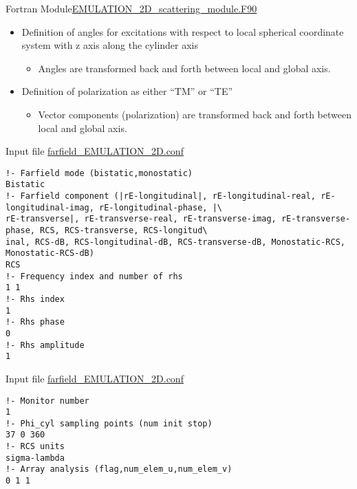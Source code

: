 \begin{frame}{Fortran Module}{\url{EMULATION_2D_scattering_module.F90} }
   \framebreak %

   \begin{itemize}
   \item Definition of angles for excitations with respect to local
     spherical coordinate system with z axis along the cylinder axis
     \begin{itemize}
     \item Angles are transformed back and forth between local and
       global axis. 
     \end{itemize}

   \item Definition of polarization as either ``TM'' or ``TE''
     \begin{itemize}
     \item Vector components (polarization) are transformed back and
       forth between local and global axis.
     \end{itemize}

   \end{itemize}

   \framebreak %


   \begin{block}{Input file \url{farfield_EMULATION_2D.conf}} 
      \begin{lstlisting}[basicstyle=\ttfamily\footnotesize,tabsize=3,frame=none]
!- Farfield mode (bistatic,monostatic)
Bistatic
!- Farfield component (|rE-longitudinal|, rE-longitudinal-real, rE-longitudinal-imag, rE-longitudinal-phase, |\
rE-transverse|, rE-transverse-real, rE-transverse-imag, rE-transverse-phase, RCS, RCS-transverse, RCS-longitud\
inal, RCS-dB, RCS-longitudinal-dB, RCS-transverse-dB, Monostatic-RCS, Monostatic-RCS-dB)
RCS
!- Frequency index and number of rhs
1 1
!- Rhs index
1
!- Rhs phase
0
!- Rhs amplitude
1
     \end{lstlisting}
   \end{block}

   \framebreak %


   \begin{block}{Input file \url{farfield_EMULATION_2D.conf}} 
      \begin{lstlisting}[basicstyle=\ttfamily\footnotesize,tabsize=3,frame=none]
!- Monitor number
1
!- Phi_cyl sampling points (num init stop)
37 0 360
!- RCS units                             
sigma-lambda
!- Array analysis (flag,num_elem_u,num_elem_v) 
0 1 1                                                                            
     \end{lstlisting}
   \end{block}


\end{frame}
